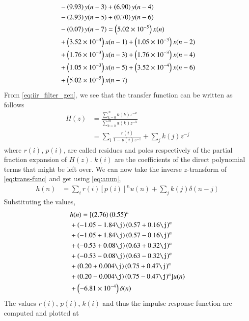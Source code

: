 \documentclass[journal,12pt,twocolumn]{IEEEtran}
\renewcommand\thesection{\arabic{section}}
\begin{document}
\begin{enumerate}[label=\thesection.\arabic*]
\begin{align}
	&- \left(9.93\right)y(n - 3) + \left(6.90\right)y(n - 4) \nonumber \\
	&- \left(2.93\right)y(n - 5) \nonumber + \left(0.70\right)y(n - 6) \nonumber \\
	&- \left(0.07\right)y(n - 7) = \left(5.02 \times 10^{-5}\right)x(n) \nonumber \\
	&+ \left(3.52 \times 10^{-4}\right)x(n - 1) + \left(1.05 \times 10^{-3}\right)x(n - 2) \nonumber \\
	&+ \left(1.76 \times 10^{-3}\right)x(n - 3) + \left(1.76 \times 10^{-3}\right)x(n - 4) \nonumber \\
	&+ \left(1.05 \times 10^{-3}\right)x(n - 5) + \left(3.52 \times 10^{-4}\right)x(n - 6) \nonumber \\
	&+ \left(5.02 \times 10^{-5}\right)x(n - 7)
\end{align}
From \eqref{eq:iir_filter_gen}, we see that the transfer function can be written as follows
\begin{align}
	H(z) &= \frac{\sum_{k = 0}^{N}b(k)z^{-k}}{\sum_{k = 0}^{M}a(k)z^{-k}} \\
		 &= \sum_{i}\frac{r(i)}{1 - p(i)z^{-1}} + \sum_{j}k(j)z^{-j}
	\label{eq:trans-func}
\end{align}
where $r(i)$, $p(i)$, are called residues and poles respectively of the partial 
fraction expansion of $H(z)$. $k(i)$ are the coefficients of the direct polynomial 
terms that might be left over. We can now take the inverse $z$-transform of
\eqref{eq:trans-func} and get using \eqref{eq:anun},
\begin{align}
	h(n) &= \sum_{i}r(i)[p(i)]^nu(n) + \sum_{j}k(j)\delta(n - j)
	\label{eq:h-n-expr}
\end{align}
Substituting the values,
\begin{align}
	&h(n) = [\brak{2.76}\brak{0.55}^n \nonumber \\ 
	&+ \brak{-1.05-1.84\j}\brak{0.57+0.16\j}^n \nonumber \\
	&+ \brak{-1.05+1.84\j}\brak{0.57-0.16\j}^n \nonumber \\
	&+ \brak{-0.53+0.08\j}\brak{0.63+0.32\j}^n \nonumber \\
	&+ \brak{-0.53-0.08\j}\brak{0.63-0.32\j}^n \nonumber \\
	&+ \brak{0.20+0.004\j}\brak{0.75+0.47\j}^n \nonumber \\
	&+ \brak{0.20-0.004\j}\brak{0.75-0.47\j}^n]u(n) \nonumber \\
	&+ \brak{-6.81 \times 10^{-4}}\delta(n)
\end{align}
The values $r(i)$, $p(i)$, $k(i)$ and thus the impulse response function are computed and plotted at

\end{enumerate}
\end{document}
